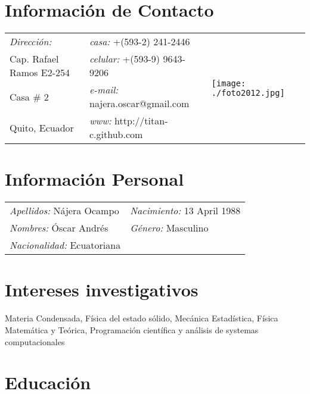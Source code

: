 \documentclass[margin,line]{res}
\newenvironment{list1}{
  \begin{list}{\ding{113}}{%
      \setlength{\itemsep}{0in}
      \setlength{\parsep}{0in} \setlength{\parskip}{0in}
      \setlength{\topsep}{0in} \setlength{\partopsep}{0in} 
      \setlength{\leftmargin}{0.17in}}}{\end{list}}
\begin{document}

\begin{resume}

\section{\sc Información de Contacto}
  \begin{tabular}{@{}p{2in}p{2.5in}p{3cm} }
    {\it Dirección:}		& {\it casa:}  +(593-2) 241-2446 &
      \multirow{4}{*}{ \texttt{[image: ./foto2012.jpg]}}\\

    Cap. Rafael Ramos E2-254	& {\it celular:} +(593-9) 9643-9206 \\
    Casa \# 2			& {\it e-mail:}  najera.oscar@gmail.com\\
    Quito, Ecuador		& {\it www:} http://titan-c.github.com
  \end{tabular}\vspace{0.5cm}

\section{\sc Información Personal}
 \begin{tabular}{ll}
  {\it Apellidos:} Nájera Ocampo & {\it Nacimiento:} 13 April 1988\\
  {\it Nombres:} Óscar Andrés   & {\it Género:} Masculino\\
  {\it Nacionalidad:} Ecuatoriana    & %
 \end{tabular}

\section{\sc Intereses investigativos}
  Materia Condensada, Física del estado sólido, Mecánica Estadística, Física Matemática y
  Teórica, Programación científica y análisis de systemas computacionales

\section{\sc Educación}


\end{resume}
\end{document}
